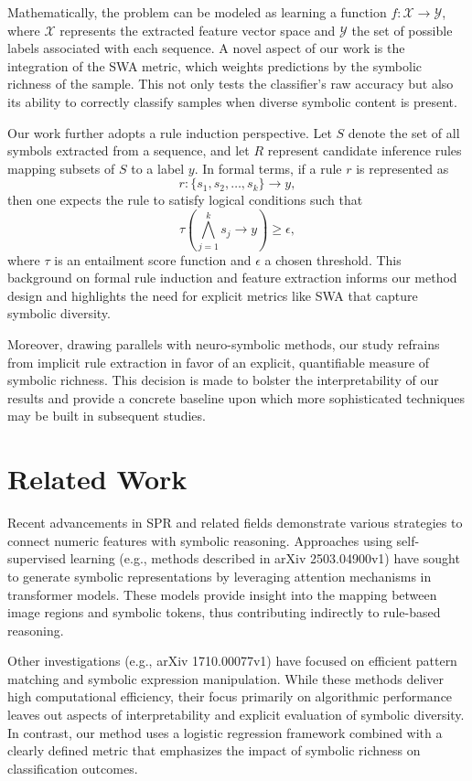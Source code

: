 \documentclass{article}
\begin{document}
Mathematically, the problem can be modeled as learning a function \(f: \mathcal{X} \rightarrow \mathcal{Y}\), where \(\mathcal{X}\) represents the extracted feature vector space and \(\mathcal{Y}\) the set of possible labels associated with each sequence. A novel aspect of our work is the integration of the SWA metric, which weights predictions by the symbolic richness of the sample. This not only tests the classifier’s raw accuracy but also its ability to correctly classify samples when diverse symbolic content is present.

Our work further adopts a rule induction perspective. Let \(S\) denote the set of all symbols extracted from a sequence, and let \(R\) represent candidate inference rules mapping subsets of \(S\) to a label \(y\). In formal terms, if a rule \(r\) is represented as 
\[
r: \{s_1, s_2, \dots, s_k\} \rightarrow y,
\]
then one expects the rule to satisfy logical conditions such that 
\[
\tau\left( \bigwedge_{j=1}^{k} s_j \rightarrow y\right) \geq \epsilon,
\]
where \(\tau\) is an entailment score function and \(\epsilon\) a chosen threshold. This background on formal rule induction and feature extraction informs our method design and highlights the need for explicit metrics like SWA that capture symbolic diversity.

Moreover, drawing parallels with neuro-symbolic methods, our study refrains from implicit rule extraction in favor of an explicit, quantifiable measure of symbolic richness. This decision is made to bolster the interpretability of our results and provide a concrete baseline upon which more sophisticated techniques may be built in subsequent studies.

\section{Related Work}
Recent advancements in SPR and related fields demonstrate various strategies to connect numeric features with symbolic reasoning. Approaches using self-supervised learning (e.g., methods described in arXiv 2503.04900v1) have sought to generate symbolic representations by leveraging attention mechanisms in transformer models. These models provide insight into the mapping between image regions and symbolic tokens, thus contributing indirectly to rule-based reasoning.

Other investigations (e.g., arXiv 1710.00077v1) have focused on efficient pattern matching and symbolic expression manipulation. While these methods deliver high computational efficiency, their focus primarily on algorithmic performance leaves out aspects of interpretability and explicit evaluation of symbolic diversity. In contrast, our method uses a logistic regression framework combined with a clearly defined metric that emphasizes the impact of symbolic richness on classification outcomes.
\end{document}
